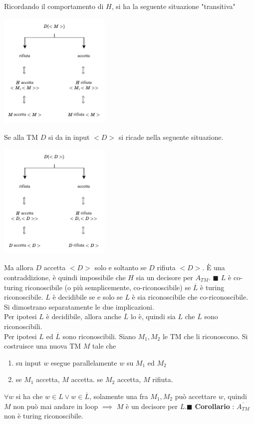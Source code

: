 \documentclass[10pt, letterpaper]{report}
\begin{document}
Ricordando il comportamento di $H$, si ha la seguente situazione "transitiva"
\begin{center}
    \includegraphics[width=0.4\textwidth ]{images/ATMnonDec.pdf}
\end{center}
Se alla TM $D$ si da in input $<D>$ si ricade nella seguente situazione.
\begin{center}
    \includegraphics[width=0.4\textwidth ]{images/ATMnonDec2.pdf}
\end{center}
Ma allora $D$ accetta $<D>$ solo e soltanto se $D$ rifiuta $<D>$. È una  contraddizione, è quindi impossibile che $H$ sia un decisore per $A_{TM}$.
\hfill$\blacksquare$\acc 
{} $L$ è co-turing riconoscibile (o più semplicemente, co-riconoscibile) se $\overline{L}$ è turing riconoscibile.\acc 
\teo{} $L$ è decidibile se e solo se $L$ è sia riconoscibile che co-riconoscibile.\acc 
\dimo{} Si dimostrano separatamente le due implicazioni. \\ 
\boxedMath{$\implies$} Per ipotesi $L$ è decidibile, allora anche $\overline{L}$ lo è, quindi sia $L$ che $\overline{L}$ sono riconoscibili. \\ 
\boxedMath{$\impliedby$} Per ipotesi $L$ ed $\overline{L}$ sono riconoscibili. Siano $M_1,M_2$ le TM che li riconoscono. Si costruisce una nuova TM $M$ tale che \begin{enumerate}
    \item su input $w$ esegue parallelamente $w$ su $M_1$ ed $M_2$
    \item se $M_1$ accetta, $M$ accetta. se $M_2$ accetta, $M$ rifiuta.
\end{enumerate}
$\forall w$ si ha che $w\in L \lor w\in \overline{L}$, solamente una fra $M_1,M_2$ può accettare $w$, quindi $M$ non può mai andare in loop $\implies$ $M$ è un decisore per $L$.\hfill$\blacksquare$\acc 
\textbf{Corollario} : $\overline{A_{TM}}$ non è turing riconoscibile.\flowerLine 
\end{document}
